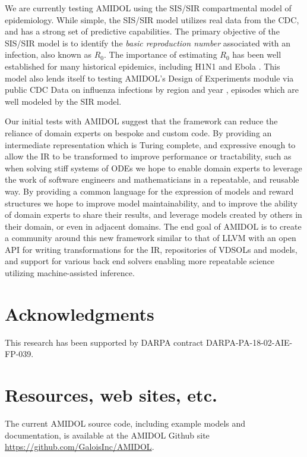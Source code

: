 \documentclass[11pt]{article}
\newcommand{\amidol}{\textsc{AMIDOL}}
\begin{document}
We are currently testing \amidol{} using the SIS/SIR compartmental model of epidemiology.  While simple, the SIS/SIR model utilizes real data from the CDC, and has a strong set of predictive capabilities.  The primary objective of the SIS/SIR model is to identify the \emph{basic reproduction number} associated with an infection, also known as $R_0$. The importance of estimating $R_0$ has been well established for many historical epidemics, including H1N1 \cite{fraser2009pandemic} and Ebola \cite{fisman2014early}.  This model also lends itself to testing \amidol{}'s Design of Experiments module via public CDC Data on influenza infections by region and year \cite{cdc2019fluview}, episodes which are well modeled by the SIR model.

Our initial tests with \amidol{} suggest that the framework can reduce the reliance of domain experts on bespoke and custom code.  By providing an intermediate representation which is Turing complete, and expressive enough to allow the IR to be transformed to improve performance or tractability, such as when solving stiff systems of ODEs \cite{enright1975comparing} we hope to enable domain experts to leverage the work of software engineers and mathematicians in a repeatable, and reusable way.  By providing a common language for the expression of models and reward structures we hope to improve model maintainability, and to improve the ability of domain experts to share their results, and leverage models created by others in their domain, or even in adjacent domains.  The end goal of \amidol{} is to create a community around this new framework similar to that of LLVM \cite{lattner2004llvm} with an open API for writing transformations for the IR, repositories of VDSOLs and models, and support for various back end solvers enabling more repeatable science utilizing machine-assisted inference.

\section{Acknowledgments}

This research has been supported by DARPA contract DARPA-PA-18-02-AIE-FP-039.

\section{Resources, web sites, etc.}

The current \amidol{} source code, including example models and documentation, is available at the \amidol{} Github site \url{https://github.com/GaloisInc/AMIDOL}.
\end{document}
